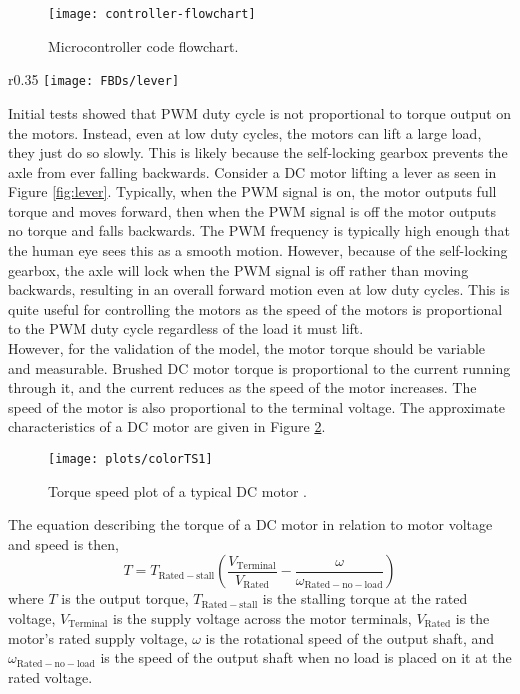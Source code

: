 \begin{figure}[!h]
	\centering
	\texttt{[image: controller-flowchart]}
	\caption{Microcontroller code flowchart.}
	\label{fig:controller-flowchart}
\end{figure}

\begin{wrapfigure}{r}{0.35\textwidth}
	\centering
	\texttt{[image: FBDs/lever]}
	\caption{Lever example}
	\label{fig:lever}
\end{wrapfigure}

Initial tests showed that PWM duty cycle is not proportional to torque output on the motors. Instead, even at low duty cycles, the motors can lift a large load, they just do so slowly. This is likely because the self-locking gearbox prevents the axle from ever falling backwards. Consider a DC motor lifting a lever as seen in Figure \ref{fig:lever}. Typically, when the PWM signal is on, the motor outputs full torque and moves forward, then when the PWM signal is off the motor outputs no torque and falls backwards. The PWM frequency is typically high enough that the human eye sees this as a smooth motion. However, because of the self-locking gearbox, the axle will lock when the PWM signal is off rather than moving backwards, resulting in an overall forward motion even at low duty cycles. This is quite useful for controlling the motors as the speed of the motors is proportional to the PWM duty cycle regardless of the load it must lift.\\

However, for the validation of the model, the motor torque should be variable and measurable. Brushed DC motor torque is proportional to the current running through it, and the current reduces as the speed of the motor increases. The speed of the motor is also proportional to the terminal voltage. The approximate characteristics of a DC motor are given in Figure \ref{fig:torque-speed}. 
\begin{figure}[!h]
	\centering
	\texttt{[image: plots/colorTS1]}
	\caption{Torque speed plot of a typical DC motor \citep{Page-1999}.}
	\label{fig:torque-speed}
\end{figure}

\noindent The equation describing the torque of a DC motor in relation to motor voltage and speed is then,
\begin{equation}
	T = T_\mathrm{Rated-stall}(\frac{V_\mathrm{Terminal}}{V_\mathrm{Rated}}-\frac{\omega}{\omega_\mathrm{Rated-no-load}})
\end{equation}
where $T$ is the output torque, $T_\mathrm{Rated-stall}$ is the stalling torque at the rated voltage, $V_\mathrm{Terminal}$ is the supply voltage across the motor terminals, $V_\mathrm{Rated}$ is the motor's rated supply voltage, $\omega$ is the rotational speed of the output shaft, and $\omega_\mathrm{Rated-no-load}$ is the speed of the output shaft when no load is placed on it at the rated voltage.\\

